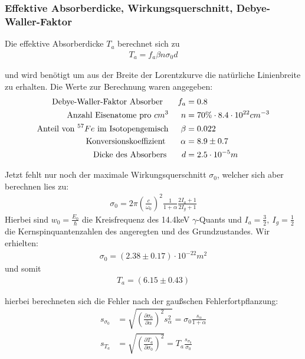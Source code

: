 \documentclass[12pt]{article}
\begin{document}
\subsubsection{Effektive Absorberdicke, Wirkungsquerschnitt, Debye-Waller-Faktor}
Die effektive Absorberdicke $T_a$ berechnet sich zu
\begin{align*}
 T_a = f_a \beta n \sigma_0 d
\end{align*}

und wird benötigt um aus der Breite der Lorentzkurve die natürliche Linienbreite zu erhalten. Die Werte zur Berechnung waren angegeben:
\begin{align*}
  \textnormal{Debye-Waller-Faktor Absorber } \hspace{15pt} f_a &= 0.8 \\
  \textnormal{Anzahl Eisenatome pro }cm^3 \hspace{15pt} n &= 70\%\cdot8.4\cdot10^{22}cm^{-3} \\
  \textnormal{Anteil von }^{57}Fe\textnormal{ im Isotopengemisch} \hspace{15pt} \beta &= 0.022 \\
  \textnormal{Konversionskoeffizient } \hspace{15pt} \alpha &= 8.9 \pm 0.7 \\
  \textnormal{Dicke des Absorbers } \hspace{15pt} d &= 2.5 \cdot 10^{-5}m \\
\end{align*}

Jetzt fehlt nur noch der maximale Wirkungsquerschnitt $\sigma_0$, welcher sich aber berechnen lies zu:
\begin{align*}
 \sigma_0 = 2\pi \left( \frac{c}{\omega_0} \right)^2 \frac{1}{1+\alpha}\frac{2 I_a +1}{2I_g+1}
\end{align*}
Hierbei sind $w_0 = \frac{E_0}{\hbar}$ die Kreisfrequenz des 14.4keV $\gamma$-Quants und $I_a=\frac{3}{2},~I_g=\frac{1}{2}$ die Kernspinquantenzahlen
des angeregten und des Grundzustandes. Wir erhielten:
\begin{align*}
 \sigma_0 = (2.38 \pm 0.17) \cdot 10^{-22}m^2
\end{align*}
und somit
\begin{align*}
 T_a = (6.15 \pm 0.43)
\end{align*}

hierbei berechneten sich die Fehler nach der gaußschen Fehlerfortpflanzung:
\begin{align*}
 s_{\sigma_0} &= \sqrt{\left( \frac{\partial \sigma_0}{\partial \alpha} \right)^2 s_{\alpha}^2 } = \sigma_0 \frac{s_{\alpha}}{1 + \alpha} \\
 s_{T_a} &= \sqrt{\left( \frac{\partial T_a}{\partial \sigma_0} \right)^2 } = T_a \frac{s_{\sigma_0}}{\sigma_0}
\end{align*}
\end{document}
